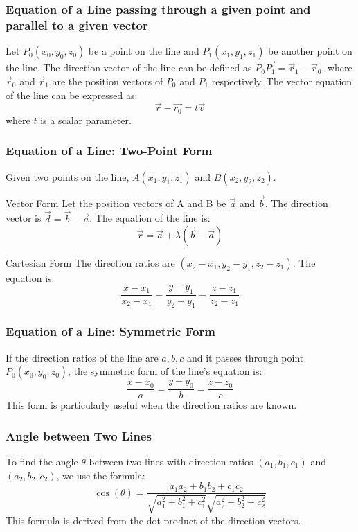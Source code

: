 \begin{frame}
\frametitle{Equation of a Line passing through a given point and parallel to a given vector}
    Let \(P_{0}(x_0, y_0, z_0)\) be a point on the line and \(P_{1}(x_1, y_1, z_1)\) be another point on the line. The direction vector of the line can be defined as \(\vec{P_{0}P_{1}} = \vec{r}_1 - \vec{r}_0\), where \(\vec{r}_0\) and \(\vec{r}_1\) are the position vectors of \(P_0\) and \(P_1\) respectively. The vector equation of the line can be expressed as:
    \[
    \vec{r} - \vec{r_0} = t\vec{v}
    \]
    where \(t\) is a scalar parameter. 
\end{frame}
\begin{frame}
    \frametitle{Equation of a Line: Two-Point Form}
    Given two points on the line, \(A(x_1, y_1, z_1)\) and \(B(x_2, y_2, z_2)\).
    \begin{block}{Vector Form}
        Let the position vectors of A and B be \(\vec{a}\) and \(\vec{b}\). The direction vector is \(\vec{d} = \vec{b} - \vec{a}\). The equation of the line is:
        \[ \vec{r} = \vec{a} + \lambda(\vec{b} - \vec{a}) \]
    \end{block}
    \begin{block}{Cartesian Form}
        The direction ratios are \((x_2 - x_1, y_2 - y_1, z_2 - z_1)\). The equation is:
        \[ \frac{x - x_1}{x_2 - x_1} = \frac{y - y_1}{y_2 - y_1} = \frac{z - z_1}{z_2 - z_1} \]
    \end{block}
\end{frame}

\begin{frame}
    \frametitle{Equation of a Line: Symmetric Form}
    If the direction ratios of the line are \(a, b, c\) and it passes through point \(P_0(x_0, y_0, z_0)\), the symmetric form of the line's equation is:
    \[
    \frac{x - x_0}{a} = \frac{y - y_0}{b} = \frac{z - z_0}{c}
    \]
    This form is particularly useful when the direction ratios are known.
\end{frame}

\begin{frame}
    \frametitle{Angle between Two Lines}
    To find the angle \(\theta\) between two lines with direction ratios \((a_1, b_1, c_1)\) and \((a_2, b_2, c_2)\), we use the formula:
    \[
    \cos(\theta) = \frac{a_1 a_2 + b_1 b_2 + c_1 c_2}{\sqrt{a_1^2 + b_1^2 + c_1^2} \sqrt{a_2^2 + b_2^2 + c_2^2}}
    \]
    This formula is derived from the dot product of the direction vectors.
\end{frame}


